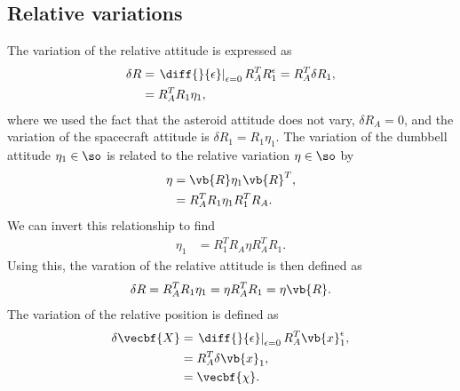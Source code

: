 \documentclass[11pt, reqno]{article}    %
\begin{document}
\subsection{Relative variations}\label{ssec:relative_variations}

The variation of the relative attitude is expressed as
\begin{align*}
    \delta R &= \left. \diff{}{\epsilon} \right|_{\epsilon=0}  R_A^T R_1^\epsilon = R_A^T \delta R_1, \\
    &= R_A^T R_1 \eta_1,
\end{align*}
where we used the fact that the asteroid attitude does not vary, \( \delta R_A = 0\), and the variation of the spacecraft attitude is \( \delta R_1 = R_1 \eta_1\).
The variation of the dumbbell attitude \( \eta_1 \in \so \) is related to the relative variation \( \eta \in \so \) by
\begin{align*}
    \eta &= \vb{R} \eta_1 \vb{R}^T ,\\
    &= R_A^T R_1 \eta_1 R_1^T R_A .
\end{align*}
We can invert this relationship to find
\begin{align*}
    \eta_1 &= R_1^T R_A \eta R_A^T R_1 .
\end{align*}
Using this, the varation of the relative attitude is then defined as
\begin{align}\label{eq:relative_attitude_variation}
    \delta R = R_A^T R_1 \eta_1 = \eta R_A^T R_1 = \eta \vb{R}.
\end{align}
The variation of the relative position is defined as
\begin{align}\label{eq:relative_position_variation}
    \delta \vecbf{X} &= \left. \diff{}{\epsilon} \right|_{\epsilon=0} R_A^T \vb{x}_1^\epsilon ,\nonumber \\
     &= R_A^T \delta \vb{x}_1 , \nonumber\\
     &= \vecbf{\chi} .
\end{align}
\end{document}
